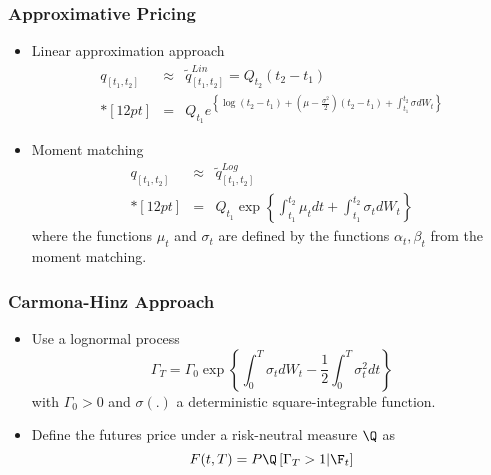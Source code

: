 \begin{frame}
\frametitle{Approximative Pricing}
\begin{itemize}
\item<1-> Linear approximation approach
$$
\begin{array}{lll}
q_{[t_1,t_2]} &\approx& \tilde{q}^{Lin}_{[t_1,t_2]} = Q_{t_2} (t_2 - t_1) \\*[12pt]
&=&\displaystyle   Q_{t_1} e^{\left\{\log (t_2 - t_1) + \left(\mu-\frac{\sigma^2}{2}\right)(t_2-t_1)+\int_{t_1}^{t_2}\sigma dW_t\right\}}
\end{array}
$$
\item<2-> Moment matching
$$
\begin{array}{lll}
q_{[t_1,t_2]} &\approx& \tilde{q}^{Log}_{[t_1,t_2]}\\*[12pt]
&=& Q_{t_1} \exp\left\{ \int_{t_1}^{t_2}\mu_t dt + \int_{t_1}^{t_2} \sigma_t dW_t\right\}
\end{array}
$$
where the functions $\mu_t$ and $\sigma_t$ are defined by the functions $\alpha_t, \beta_t$ from the moment matching.
\end{itemize}
\end{frame}

\begin{frame}
\frametitle{Carmona-Hinz Approach}
\begin{itemize}
\item<1-> Use a lognormal process
$$
\Gamma_{T}= \Gamma_0  \exp{\left\{\int_{0}^{T}\sigma_t dW_t -\frac{1}{2}\int_0^T \sigma^2_t dt\right\}}
$$
with $\Gamma_0 >0$ and $\sigma(.)$ a deterministic square-integrable function.
\item<2-> Define the futures price under a risk-neutral measure $\Q$ as
$$
F(t,T) = P \Q\left[\Gamma_T>1 |\F_t\right]
$$
\end{itemize}
\end{frame}


